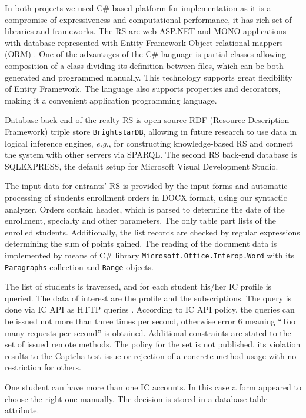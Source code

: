 \documentclass[conference]{IEEEtran}
\begin{document}
In both projects we used C\#-based platform \cite{ben16} for implementation as it is a compromise of expressiveness and computational performance, it has rich set of libraries and frameworks.  The RS are web ASP.NET and MONO applications with database represented with Entity Framework Object-relational mappers (ORM) \cite{ef15}.  One of the advantages of the C\# language is partial classes allowing composition of a class dividing its definition between files, which can be both generated and programmed manually.  This technology supports great flexibility of Entity Framework.  The language also supports properties and decorators, making it a convenient application programming language.

Database back-end of the realty RS is open-source RDF (Resource Description Framework) triple store \texttt{BrightstarDB}, allowing in future research to use data in logical inference engines, \emph{e.g.}, for constructing knowledge-based RS and connect the system with other servers via SPARQL.  The second RS back-end database is SQLEXPRESS, the default setup for Microsoft Visual Development Studio.

The input data for entrants' RS is provided by the input forms and automatic processing of students enrollment orders in DOCX format, using our syntactic analyzer.  Orders contain header, which is parsed to determine the date of the enrollment, specialty and other parameters.  The only table part lists of the enrolled students.  Additionally, the list records are checked by regular expressions determining the sum of points gained.  The reading of the document data is implemented by means of C\# library \texttt{Microsoft.Office.Interop.Word} with its \texttt{Paragraphs} collection and \texttt{Range} objects.

The list of students is traversed, and for each student his/her IC profile is queried.  The data of interest are the profile and the subscriptions.  The query is done via IC API as HTTP queries \cite{apivk}.  According to IC API policy, the queries can be issued not more than three times per second, otherwise error 6 meaning ``Too many requests per second'' is obtained.  Additional constraints are stated to the set of issued remote methods.  The policy for the set is not published, its violation results to the Captcha test issue or rejection of a concrete method usage with no restriction for others.


One student can have more than one IC accounts.  In this case a form appeared to choose the right one manually.  The decision is stored in a database table attribute.
\end{document}
